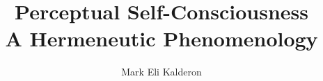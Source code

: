\documentclass[12pt]{book}
\newcommand\myauthor{Mark Eli Kalderon}
\begin{document}
\author{\myauthor}
\title{Perceptual Self-Consciousness\\
A Hermeneutic Phenomenology}
\date{}

\maketitle
{}
\frontmatter
% 
\tableofcontents
% 


\mainmatter










\backmatter

% 


\nocite{Heinze:1899aa}
\nocite{Gauthier:1984aa}
\nocite{Pasnau:1999pd}
\nocite{Hayduck:1897fb}
\nocite{Bywater:1886vl}
\nocite{Rahman:1952mi}
\nocite{Wendland:1955gg}
\nocite{Vigneul-Marville:1725aa}
\nocite{Sartre:1963aa}
\nocite{Sartre:2004ss}
\nocite{Sartre:1969ix}
\nocite{Husserl:1913sb}
\nocite{Kempe:1940aa}

 


\end{document}
